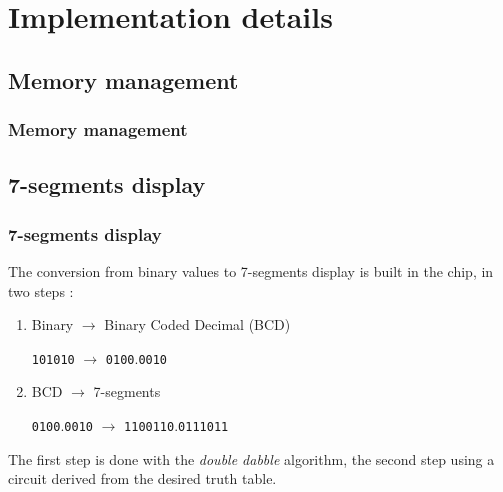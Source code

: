 \documentclass{beamer}
\begin{document}
\section{Implementation details}


\subsection{Memory management}

\begin{frame}
	\frametitle{Memory management}
	\centering
	
\end{frame}

\subsection{7-segments display}

\begin{frame}
\frametitle{7-segments display}
The conversion from binary values to 7-segments display is built in the chip, in two steps :
\begin{enumerate}
    \item Binary $\rightarrow$ Binary Coded Decimal (BCD)
        
          \texttt{101010} $\rightarrow$ \texttt{0100}.\texttt{0010}
    \item BCD $\rightarrow$ 7-segments

        \texttt{0100}.\texttt{0010} $\rightarrow$ \texttt{1100110}.\texttt{0111011}
\end{enumerate}

The first step is done with the \emph{double dabble} algorithm, the second step using a circuit derived
from the desired truth table.

\end{frame}
\end{document}
